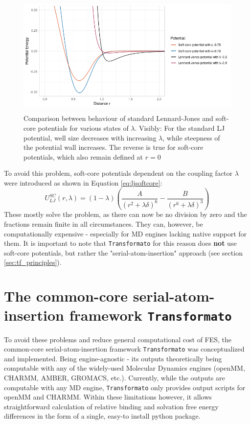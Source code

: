\documentclass[oneside]{scrreprt}
\begin{document}
\begin{figure}
    \centering
    \includegraphics[height=6cm]{LJandsoftcore.png}
    \caption[Comparision between behaviour of standard LJ potentials vs. soft-core potentials]{Comparison between behaviour of standard Lennard-Jones and soft-core potentials for various states of $\lambda$. Visibly: For the standard LJ potential, well size decreases with increasing $\lambda$, while steepness of the potential wall increases. The reverse is true for soft-core potentials, which also remain defined at $r=0$}
    \label{fig:ljandsoftcore}
\end{figure}

To avoid this problem, soft-core potentials dependent on the coupling factor $\lambda$ were introduced as shown in Equation \ref{eq:ljsoftcore}\cite{Beutler1994Jun}:
\begin{equation}
U_{LJ}^{SC}(r,\lambda)=(1-\lambda)(\frac{A}{(r^2 +\lambda \delta)^6 }-\frac{B}{(r^6 +\lambda \delta)^3})
\label{eq:ljsoftcore}
\end{equation}
These mostly solve the problem, as there can now be no division by zero and the fractions remain finite in all circumstances. They can, however, be computationally expensive  - especially for MD engines lacking native support for them\cite{Li2020Aug}. It is important to note that \texttt{Transformato} for this reason does \textbf{not} use soft-core potentials, but rather the "serial-atom-insertion" approach (see section \ref{sec:tf_principles}).


\section{The common-core serial-atom-insertion framework {\texttt{Transformato}}}
To avoid these problems and reduce general computational cost of FES, the common-core serial-atom-insertion framework \texttt{Transformato} was conceptualized and implemented. Being engine-agnostic - its outputs theoretically being computable with any of the widely-used Molecular Dynamics engines (openMM, CHARMM, AMBER, GROMACS, etc.). Currently, while the outputs are computable with any MD engine, \texttt{Transformato}  only provides output scripts for openMM and CHARMM. Within these limitations however, it allows straightforward calculation of relative binding and solvation free energy differences in the form of a single, easy-to install python package.
\end{document}

